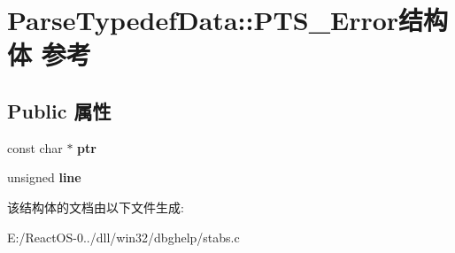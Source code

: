 \hypertarget{struct_parse_typedef_data_1_1_p_t_s___error}{}\section{Parse\+Typedef\+Data\+:\+:P\+T\+S\+\_\+\+Error结构体 参考}
\label{struct_parse_typedef_data_1_1_p_t_s___error}
\subsection*{Public 属性}
\begin{DoxyCompactItemize}
\item 
\mbox{\label{struct_parse_typedef_data_1_1_p_t_s___error_a502bcfb06632ac35e07c63f59b197e40}} 
const char $\ast$ {\bfseries ptr}
\item 
\mbox{\label{struct_parse_typedef_data_1_1_p_t_s___error_a0bc6c6a6af7d4f1cc479a82563df64f9}} 
unsigned {\bfseries line}
\end{DoxyCompactItemize}


该结构体的文档由以下文件生成\+:\begin{DoxyCompactItemize}
\item 
E\+:/\+React\+O\+S-\/0../dll/win32/dbghelp/stabs.\+c\end{DoxyCompactItemize}
